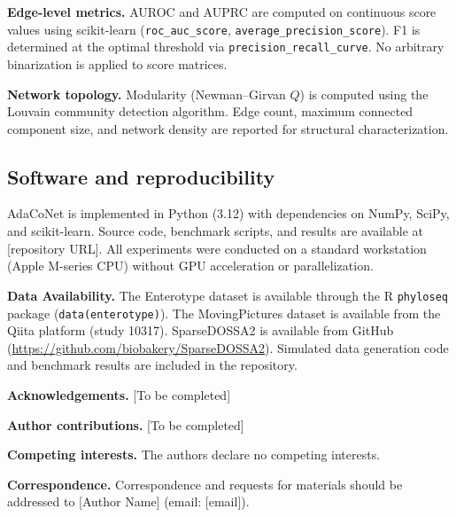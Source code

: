 \documentclass[fleqn]{nature}
\begin{document}
\begin{methods}
\textbf{Edge-level metrics.}
AUROC and AUPRC are computed on continuous score values using scikit-learn (\texttt{roc\_auc\_score}, \texttt{average\_precision\_score}).
F1 is determined at the optimal threshold via \texttt{precision\_recall\_curve}.
No arbitrary binarization is applied to score matrices.

\textbf{Network topology.}
Modularity (Newman--Girvan $Q$) is computed using the Louvain community detection algorithm.
Edge count, maximum connected component size, and network density are reported for structural characterization.


\subsection*{Software and reproducibility}

AdaCoNet is implemented in Python (3.12) with dependencies on NumPy, SciPy, and scikit-learn.
Source code, benchmark scripts, and results are available at [repository URL].
All experiments were conducted on a standard workstation (Apple M-series CPU) without GPU acceleration or parallelization.

\end{methods}



\begin{addendum}

\textbf{Data Availability.}
The Enterotype dataset is available through the R \texttt{phyloseq} package (\texttt{data(enterotype)}).
The MovingPictures dataset is available from the Qiita platform (study 10317).
SparseDOSSA2 is available from GitHub (\url{https://github.com/biobakery/SparseDOSSA2}).
Simulated data generation code and benchmark results are included in the repository.

\textbf{Acknowledgements.}
[To be completed]

\textbf{Author contributions.}
[To be completed]

\textbf{Competing interests.}
The authors declare no competing interests.

\textbf{Correspondence.}
Correspondence and requests for materials should be addressed to [Author Name] (email: [email]).

\end{addendum}





\end{document}

